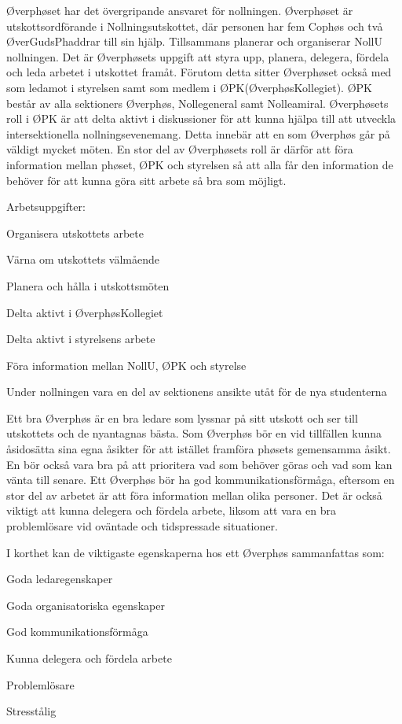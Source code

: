 \documentclass[10pt]{article}
\def\post{Øverphøs}
\def\doctitle{Kravprofil för \post}
\begin{document}
\heading{\doctitle}


Øverphøset har det övergripande ansvaret för nollningen. Øverphøset är utskottsordförande i Nollningsutskottet, där personen har fem Cophøs och två ØverGudsPhaddrar till sin hjälp. Tillsammans planerar och organiserar NollU nollningen. Det är Øverphøsets uppgift att styra upp, planera, delegera, fördela och leda arbetet i utskottet framåt. Förutom detta sitter Øverphøset också med som ledamot i styrelsen samt som medlem i ØPK(ØverphøsKollegiet). ØPK består av alla sektioners Øverphøs, Nollegeneral samt Nolleamiral. Øverphøsets roll i ØPK är att delta aktivt i diskussioner för att kunna hjälpa till att utveckla intersektionella nollningsevenemang. Detta innebär att en som Øverphøs går på väldigt mycket möten. En stor del av Øverphøsets roll är därför att föra information mellan phøset, ØPK och styrelsen så att alla får den information de behöver för att kunna göra sitt arbete så bra som möjligt.


Arbetsuppgifter:
\begin{dashlist}
    \item Organisera utskottets arbete
    \item Värna om utskottets välmående
    \item Planera och hålla i utskottsmöten
    \item Delta aktivt i ØverphøsKollegiet
    \item Delta aktivt i styrelsens arbete
    \item Föra information mellan NollU, ØPK och styrelse
    \item Under nollningen vara en del av sektionens ansikte utåt för de nya studenterna
\end{dashlist}

Ett bra {\post} är en bra ledare som lyssnar på sitt utskott och ser till utskottets och de nyantagnas bästa. Som Øverphøs bör en vid tillfällen kunna åsidosätta sina egna åsikter för att istället framföra phøsets gemensamma åsikt. En bör också vara bra på att prioritera vad som behöver göras och vad som kan vänta till senare. Ett Øverphøs bör ha god kommunikationsförmåga, eftersom en stor del av arbetet är att föra information mellan olika personer. Det är också viktigt att kunna delegera och fördela arbete, liksom att vara en bra problemlösare vid oväntade och tidspressade situationer.

I korthet kan de viktigaste egenskaperna hos ett {\post} sammanfattas som:
\begin{dashlist}
    \item Goda ledaregenskaper
    \item Goda organisatoriska egenskaper
    \item God kommunikationsförmåga
    \item Kunna delegera och fördela arbete
    \item Problemlösare
    \item Stresstålig
\end{dashlist}
\end{document}
